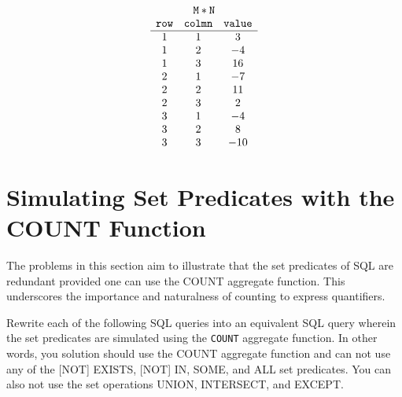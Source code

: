 \documentclass{article}
\begin{document}
\begin{enumerate}[resume]
\[
\begin{array}{c}
{\tt M*N} \\ 
 \begin{array}{ccc}
 {\tt row} & {\tt colmn} & {\tt value} \\ \hline
1 & 1 & 3 \\
1 & 2 & -4 \\
1 & 3 & 16 \\
2 & 1 & -7\\
2 & 2 & 11 \\
2 & 3 & 2 \\
3 & 1 & -4 \\
3 & 2 & 8\\
3 & 3 & -10 \\
 \end{array}
\end{array}
\]



\end{enumerate}

\newpage
\section{Simulating Set Predicates with the COUNT Function}

The problems in this section aim to illustrate that the set predicates of SQL are redundant provided one can use the
COUNT aggregate function.   This underscores the importance and naturalness of counting to express quantifiers.

Rewrite each of the following SQL queries into an equivalent SQL query wherein the
set predicates  are simulated using the {\tt COUNT} aggregate function.
In other words, you solution should use the COUNT aggregate function and can not use any of the [NOT] EXISTS, [NOT] IN, 
SOME, and ALL set predicates.   You can also not use the set operations UNION, INTERSECT, and EXCEPT.
\end{document}
